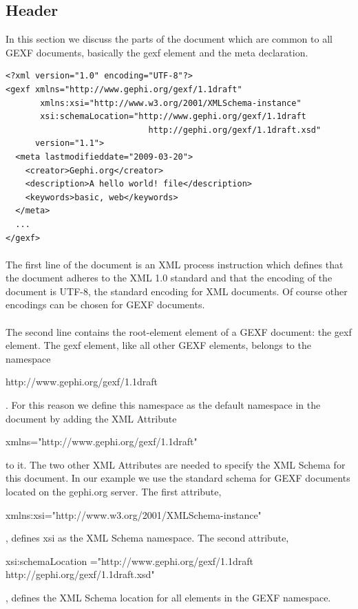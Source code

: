 \documentclass[a4paper,10pt]{article}
\begin{document}
\subsection{Header}

In this section we discuss the parts of the document which are common to all GEXF documents, basically the gexf element and the meta declaration.

\lstset{ style=gexf }
\begin{lstlisting}[caption={Header},label=header]
<?xml version="1.0" encoding="UTF-8"?>
<gexf xmlns="http://www.gephi.org/gexf/1.1draft"
       xmlns:xsi="http://www.w3.org/2001/XMLSchema-instance"
       xsi:schemaLocation="http://www.gephi.org/gexf/1.1draft
                             http://gephi.org/gexf/1.1draft.xsd"
      version="1.1">
  <meta lastmodifieddate="2009-03-20">
    <creator>Gephi.org</creator>
    <description>A hello world! file</description>
    <keywords>basic, web</keywords>
  </meta>
  ...
</gexf>
\end{lstlisting}

\paragraph{}
The first line of the document is an XML process instruction which defines that the document adheres to the XML 1.0 standard and that the encoding of the document is UTF-8, the standard encoding for XML documents. Of course other encodings can be chosen for GEXF documents.

\paragraph{}
The second line contains the root-element element of a GEXF document: the gexf element. The gexf element, like all other GEXF elements, belongs to the namespace \begin{footnotesize}http://www.gephi.org/gexf/1.1draft\end{footnotesize}. For this reason we define this namespace as the default namespace in the document by adding the XML Attribute \begin{footnotesize}xmlns="http://www.gephi.org/gexf/1.1draft"\end{footnotesize} to it. The two other XML Attributes are needed to specify the XML Schema for this document. In our example we use the standard schema for GEXF documents located on the gephi.org server. The first attribute, \begin{footnotesize}xmlns:xsi="http://www.w3.org/2001/XMLSchema-instance"\end{footnotesize}, defines xsi as the XML Schema namespace. The second attribute, \begin{footnotesize}xsi:schemaLocation ="http://www.gephi.org/gexf/1.1draft http://gephi.org/gexf/1.1draft.xsd"\end{footnotesize}, defines the XML Schema location for all elements in the GEXF namespace.
\end{document}
